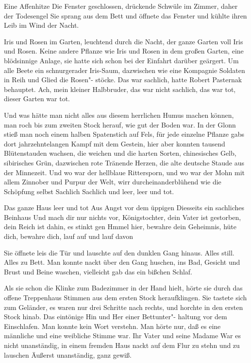 Eine Affenhitze\ausr{} Die Fenster geschlossen, drückende Schwüle
im Zimmer, daher der Todesengel\ausr{} Sie sprang aus dem Bett
und öffnete das Fenster und kühlte ihren Leib im Wind der
Nacht.

Iris und Rosen im Garten, leuchtend durch die Nacht, der
ganze Garten voll Iris und Rosen. Keine andere Pflanze
wie Iris und Rosen in dem großen Garten, eine blödsinnige
Anlage, sie hatte sich schon bei der Einfahrt darüber geärgert.
Um alle Beete ein schnurgerader Iris-Saum, dazwischen
wie eine Kompagnie Soldaten in Reih und Glied die Rosen"-%
stöcke. Das war sachlich, hatte Robert Pasternak behauptet.
Ach, mein kleiner Halbbruder, das war nicht sachlich, das war
tot, dieser Garten war tot.

Und was hätte man nicht alles aus diesem herrlichen Humus
machen können, man roch bis zum zweiten Stock herauf,
wie gut der Boden war. In der Glonn stieß man noch einem
halben Spatenstich auf Fels, für jede einzelne Pflanze gabs
dort jahrzehntelangen Kampf mit dem Gestein, hier aber
konnten tausend Blütenstauden wachsen, die weichen und die
harten Sorten, chinesisches Gelb, sibirisches Grün, dazwischen
rote Tränende Herzen, die alte deutsche Staude aus der
Minnezeit. Und wo war der hellblaue Rittersporn, und wo war
der Mohn mit allem Zinnober und Purpur der Welt, wirr
durcheinanderblühend wie die Schöpfung selbst\frag{} Sachlich\ausr{}
Sachlich und leer, leer und tot.

Das ganze Haus leer und tot\ausr{} Aus Angst vor dem üppigen
Diesseits ein sachliches Beinhaus\ausr{} Und mach dir nur nichts
vor, Königstochter, dein Vater ist gestorben, dein Reich ist
dahin, es stinkt gen Hmmel hier, bewahre dein Geheimnis,
hüte dich, bewahre dich, lauf auf und lauf davon\ausr{}

Sie öffnete leis die Tür und lauschte auf den dunklen Gang
hinaus. Alles still. Alles zu Bett. Man konnte nackt über den
Gang huschen, ins Bad, Gesicht und Brust und Beine waschen,
vielleicht gab das ein bißchen Schlaf.

Als sie schon die Klinke zum Badezimmer in der Hand hielt,
hörte sie durch das offene Treppenhaus Stimmen aus dem
ersten Stock heraufklingen. Sie tastete sich zum Geländer, es
waren nur drei Schritte nach rechts, und horchte in den ersten
Stock hinab. Das eintönige Hin und Her einer Bettunter"-%
haltung vor dem Einschlafen. Man konnte kein Wort verstehn.
Man hörte nur, daß es eine männliche und eine weibliche
Stimme war. Ihr Vater und seine Madame\frag{} War es nicht
unanständig, in einem fremden Haus nackt auf dem Flur zu
stehn und zu lauschen\frag{} Äußerst unanständig, ganz gewiß.

